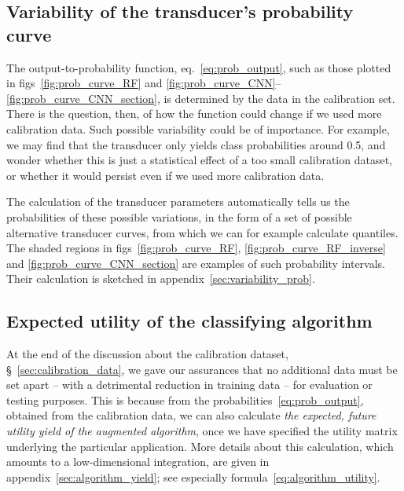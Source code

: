 \documentclass[a4paper,12pt,%
onecolumn,oneside,article,%
british%
]{memoir}
\renewcommand*{\|}[1][]{\nonscript\:#1\vert\nonscript\:\mathopen{}}
\newcommand*{\sect}{\S}%
\newcommand*{\eqn}{eq.}%
\newcommand*{\figs}{figs}%
\begin{document}
\subsection{Variability of the transducer's probability curve}
\label{sec:variability_curve}

The output-to-probability function, \eqn~\eqref{eq:prob_output}, such as those plotted in \figs~\ref{fig:prob_curve_RF} and \ref{fig:prob_curve_CNN}--\ref{fig:prob_curve_CNN_section}, is determined by the data in the calibration set. There is the question, then, of how the function could change if we used more calibration data. Such possible variability could be of importance. For example, we may find that the transducer only yields class probabilities around 0.5, and wonder whether this is just a statistical effect of a too small calibration dataset, or whether it would persist even if we used more calibration data.

The calculation of the transducer parameters automatically tells us the probabilities of these possible variations, in the form of  a set of possible alternative transducer curves, from which we can for example calculate quantiles. The shaded regions in \figs~\ref{fig:prob_curve_RF}, \ref{fig:prob_curve_RF_inverse} and \ref{fig:prob_curve_CNN_section} are examples of such probability intervals. Their calculation is sketched in appendix~\ref{sec:variability_prob}.

\subsection{Expected utility of the classifying algorithm}
\label{sec:yield_of_classifier}

At the end of the discussion about the calibration dataset, \sect~\ref{sec:calibration_data}, we gave our assurances that no additional data must be set apart -- with a detrimental reduction in training data -- for evaluation or testing purposes. This is because from the probabilities~\eqref{eq:prob_output}, obtained from the calibration data, we can also calculate \emph{the expected, future utility yield of the augmented algorithm}, once we have specified the utility matrix underlying the particular application. More details about this calculation, which amounts to a low-dimensional integration, are given in appendix~\ref{sec:algorithm_yield}; see especially formula~\eqref{eq:algorithm_utility}.
\end{document}
